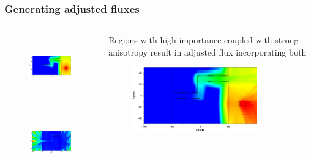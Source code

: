 \documentclass[handout]{beamer}
\renewcommand{\(}{\begin{columns}}
\renewcommand{\)}{\end{columns}}
\newcommand{\<}[1]{\begin{column}{#1}}
\renewcommand{\>}{\end{column}}
\begin{document}

\begin{frame}[fragile]
  \frametitle{Generating adjusted fluxes}
  \begin{columns}
    \begin{column}{0.5\textwidth}
  	\begin{figure}
  	\begin{center}
  		\includegraphics[height=1.1in,clip]{maze2_adjoint_group26_adjusted_cropped.png}
	\end{center}
  	\end{figure}
  	  \begin{figure}
  	\begin{center}
  		\includegraphics[height=1.1in,clip]{maze2_anisotropy_contributon_group26_cropped.png}
	\end{center}
  	\end{figure}
    \end{column}
  \pause
    \begin{column}{0.5\textwidth}
   Regions with high importance coupled with strong anisotropy result in adjusted flux incorporating both
  	\begin{figure}
  	\begin{center}
  		\includegraphics[height=1.1in,clip]{maze2_myflux_group26_adjusted_cropped.png}
	\end{center}
  	\end{figure}
  	\end{column}  
  \end{columns}
\end{frame}
\end{document}
